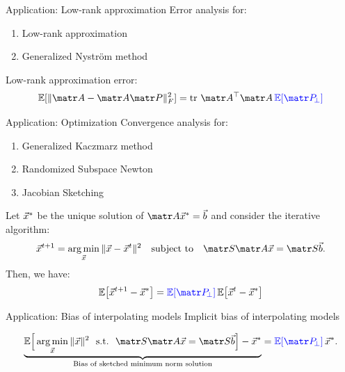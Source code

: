 \begin{frame}{Application: Low-rank approximation}
  Error analysis for:
   \begin{enumerate}
     \item Low-rank approximation \parencite{tropp2011structure}
     \item Generalized Nystr\"om method \parencite{revisiting-nystrom}
    \end{enumerate}
    
    
    Low-rank approximation error:
    \begin{align*}
      \E[\|\A - \A\P\|_F^2]= \tr\,\A^\top\A\,\Blue{\E[\P_{\!\perp}]}
    \end{align*}
\end{frame}

\begin{frame}{Application: Optimization}
    Convergence analysis for:
  \begin{enumerate}
  \item Generalized Kaczmarz method \parencite{generalized-kaczmarz}
  \item Randomized Subspace Newton  \parencite{Gower2019}
  \item Jacobian Sketching \parencite{jacsketch}
  \end{enumerate}

    Let $\vec{x}^*$
    be the unique solution of $\A\x^*=\b$ and consider
  the iterative algorithm:
  \begin{align*}
    \x^{t+1} = \argmin_{\x} \|\x-\x^t\|^2\quad\textnormal{subject to}\quad\S\A\x=\S\b.
  \end{align*}
Then, we have:
  \begin{align*}
    \E\big[\x^{t+1}-\x^*\big] =
    \Blue{\E[\P_{\!\perp}]}\,\E\big[\x^t-\x^*\big]
  \end{align*}
\end{frame}

\begin{frame}{Application: Bias of interpolating models}
Implicit bias of interpolating models \parencite{surrogate-design}


\begin{align*}
  \underbrace{\E\Big[\argmin_{\x} \|\x\|^2\ \ \textnormal{s.t.}\ \
    \S\A\x=\S\b\Big] - \x^*}_{\text{Bias of sketched minimum norm
  solution}}
  = \Blue{\E[\P_{\!\perp}]}\,\x^*.
\end{align*}
\end{frame}

